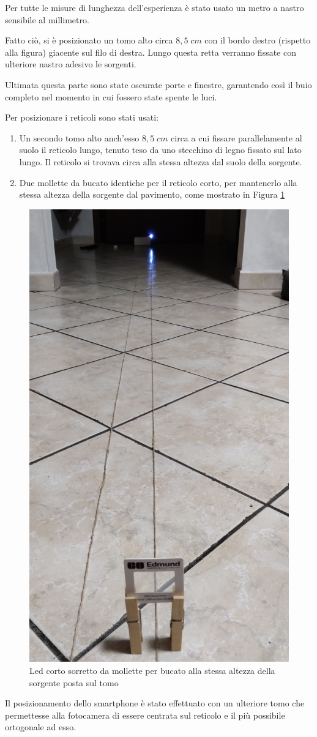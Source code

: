 \documentclass{article}
\begin{document}
\vspace{3mm}

Per tutte le misure di lunghezza dell'esperienza è stato usato un metro a nastro sensibile al millimetro.

\vspace{3mm}

Fatto ciò, si è posizionato un tomo alto circa $8,5 \; cm$ con il bordo destro (rispetto alla figura) giacente sul filo di destra. Lungo questa retta verranno fissate con ulteriore nastro adesivo le sorgenti. 

\vspace{3mm}

Ultimata questa parte sono state oscurate porte e finestre, garantendo così il buio completo nel momento in cui fossero state spente le luci. 

\pagebreak

Per posizionare i reticoli sono stati usati:
\begin{enumerate}
    \item Un secondo tomo alto anch'esso $8,5 \; cm$ circa a cui fissare parallelamente al suolo il reticolo lungo, tenuto teso da uno stecchino di legno fissato sul lato lungo. Il reticolo si trovava circa alla stessa altezza dal suolo della sorgente.
    \item Due mollette da bucato identiche per il reticolo corto, per mantenerlo alla stessa altezza della sorgente dal pavimento, come mostrato in Figura \ref{impalcatura}
\end{enumerate}

\begin{figure}[h]
    \centering
    \includegraphics[width=0.2\linewidth]{LedCorto2_Impalcatura.jpg}
    \caption{Led corto sorretto da mollette per bucato alla stessa altezza della sorgente posta sul tomo}
    \label{impalcatura}
\end{figure}

Il posizionamento dello smartphone è stato effettuato con un ulteriore tomo che permettesse alla fotocamera di essere centrata sul reticolo e il più possibile ortogonale ad esso.
\end{document}
